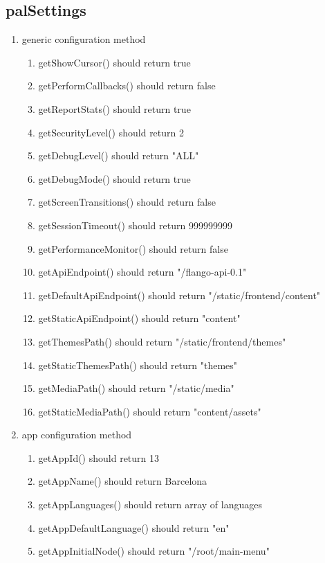 \begin{singlespace}
\section{palSettings}
\begin{enumerate}
\item     generic configuration method
\begin{enumerate}
\item         getShowCursor() should return true
\item         getPerformCallbacks() should return false
\item         getReportStats() should return true
\item         getSecurityLevel() should return 2
\item         getDebugLevel() should return "ALL"
\item         getDebugMode() should return true
\item         getScreenTransitions() should return false
\item         getSessionTimeout() should return 999999999
\item         getPerformanceMonitor() should return false
\item         getApiEndpoint() should return "/flango-api-0.1"
\item         getDefaultApiEndpoint() should return "/static/frontend/content"
\item         getStaticApiEndpoint() should return "content"
\item         getThemesPath() should return "/static/frontend/themes"
\item         getStaticThemesPath() should return "themes"
\item         getMediaPath() should return "/static/media"
\item         getStaticMediaPath() should return "content/assets"
\end{enumerate}
\item     app configuration method
\begin{enumerate}
\item         getAppId() should return 13
\item         getAppName() should return Barcelona
\item         getAppLanguages() should return array of languages
\item         getAppDefaultLanguage() should return "en"
\item         getAppInitialNode() should return "/root/main-menu"

\end{enumerate}
\end{enumerate}
\end{singlespace}
